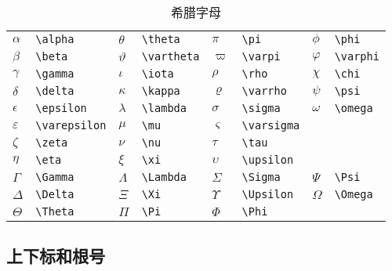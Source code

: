 \begin{table}[htbp]
\caption{希腊字母}
\label{tab:greek}
\centering
\begin{tabular}{llllllll}
  \toprule
  $\alpha$      & \verb|\alpha|      & $\theta$    & \verb|\theta|    & 
    $\pi$       & \verb|\pi|         & $\phi$      & \verb|\phi|      \\
  $\beta$       & \verb|\beta|       & $\vartheta$ & \verb|\vartheta| & 
    $\varpi$    & \verb|\varpi|      & $\varphi$   & \verb|\varphi|   \\
  $\gamma$      & \verb|\gamma|      & $\iota$     & \verb|\iota|     & 
    $\rho$      & \verb|\rho|        & $\chi$      & \verb|\chi|      \\
  $\delta$      & \verb|\delta|      & $\kappa$    & \verb|\kappa|    & 
    $\varrho$   & \verb|\varrho|     & $\psi$      & \verb|\psi|      \\
  $\epsilon$    & \verb|\epsilon|    & $\lambda$   & \verb|\lambda|   & 
    $\sigma$    & \verb|\sigma|      & $\omega$    & \verb|\omega|    \\
  $\varepsilon$ & \verb|\varepsilon| & $\mu$       & \verb|\mu|       & 
    $\varsigma$ & \verb|\varsigma|   &             &                  \\
  $\zeta$       & \verb|\zeta|       & $\nu$       & \verb|\nu|       & 
    $\tau$      & \verb|\tau|        &             &                  \\
  $\eta$        & \verb|\eta|        & $\xi$       & \verb|\xi|       & 
    $\upsilon$  & \verb|\upsilon|    &             &                  \\
  \midrule
  $\Gamma$      & \verb|\Gamma|      & $\Lambda$   & \verb|\Lambda|   & 
    $\Sigma$    & \verb|\Sigma|      & $\Psi$      & \verb|\Psi| \\
  $\Delta$      & \verb|\Delta|      & $\Xi$       & \verb|\Xi|       & 
    $\Upsilon$  & \verb|\Upsilon|    & $\Omega$    & \verb|\Omega| \\
  $\Theta$      & \verb|\Theta|      & $\Pi$       & \verb|\Pi|       & 
    $\Phi$      & \verb|\Phi|        &             & \\
  \bottomrule
\end{tabular}
\end{table}

\subsection{上下标和根号}

